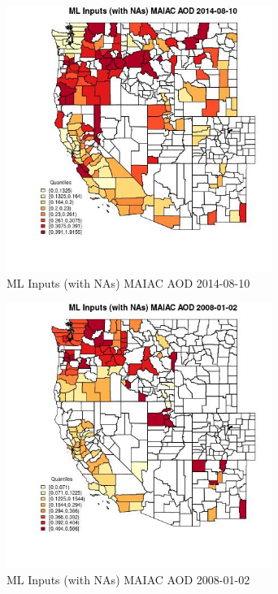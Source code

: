 \begin{figure} 
\centering  
\includegraphics[width=0.77\textwidth]{Code_Outputs/Report_ML_input_PM25_Step4_part_e_de_duplicated_aves_compiled_2019-05-18wNAs_CountyMAIAC_AODMean2014-08-10_2014-08-10.jpg} 
\caption{\label{fig:Report_ML_input_PM25_Step4_part_e_de_duplicated_aves_compiled_2019-05-18wNAsCountyMAIAC_AODMean2014-08-10_2014-08-10}ML Inputs (with NAs) MAIAC AOD 2014-08-10} 
\end{figure} 
 

\clearpage 

\begin{figure} 
\centering  
\includegraphics[width=0.77\textwidth]{Code_Outputs/Report_ML_input_PM25_Step4_part_e_de_duplicated_aves_compiled_2019-05-18wNAs_CountyMAIAC_AODMean2008-01-02_2008-01-02.jpg} 
\caption{\label{fig:Report_ML_input_PM25_Step4_part_e_de_duplicated_aves_compiled_2019-05-18wNAsCountyMAIAC_AODMean2008-01-02_2008-01-02}ML Inputs (with NAs) MAIAC AOD 2008-01-02} 
\end{figure} 
 

